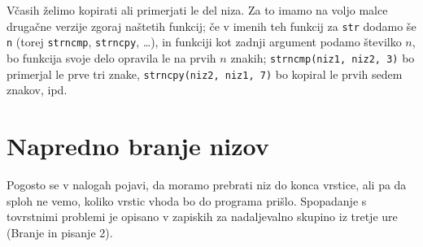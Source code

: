 Včasih želimo kopirati ali primerjati le del niza.
Za to imamo na voljo malce drugačne verzije zgoraj naštetih funkcij; če v imenih
teh funkcij za \verb+str+ dodamo še \verb+n+ (torej \verb+strncmp+,
\verb+strncpy+, \ldots), in funkciji kot zadnji argument podamo številko $n$, bo
funkcija svoje delo opravila le na prvih $n$ znakih;
\verb+strncmp(niz1, niz2, 3)+ bo primerjal le prve tri znake,
\verb+strncpy(niz2, niz1, 7)+ bo kopiral le prvih sedem znakov, ipd.

\section{Napredno branje nizov}

Pogosto se v nalogah pojavi, da moramo prebrati niz do konca vrstice, ali pa da
sploh ne vemo, koliko vrstic vhoda bo do programa prišlo.
Spopadanje s tovrstnimi problemi je opisano v zapiskih za nadaljevalno skupino
iz tretje ure (Branje in pisanje 2).

